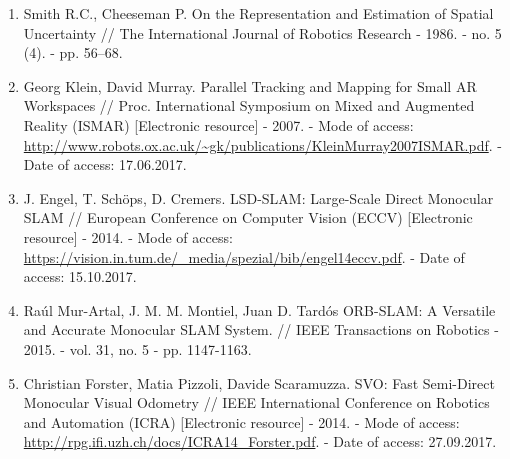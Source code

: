 \begin{enumerate}
    
    \item \label{itm:cheeseman} Smith R.C., Cheeseman P. On the Representation and Estimation of Spatial Uncertainty // The International Journal of Robotics Research - 1986. - no. 5 (4). - pp. 56–68.
    
    \item \label{itm:ptam} Georg Klein, David Murray. Parallel Tracking and Mapping for Small AR Workspaces // Proc. International Symposium on Mixed and Augmented Reality (ISMAR) [Electronic resource] - 2007. - Mode of access: \url{http://www.robots.ox.ac.uk/~gk/publications/KleinMurray2007ISMAR.pdf}. - Date of access: 17.06.2017.
    
    \item \label{itm:lsd} J. Engel, T. Schöps, D. Cremers. LSD-SLAM: Large-Scale Direct Monocular SLAM // European Conference on Computer Vision (ECCV) [Electronic resource] - 2014. - Mode of access: \url{https://vision.in.tum.de/_media/spezial/bib/engel14eccv.pdf}. - Date of access: 15.10.2017.
    
    \item \label{itm:orbslam} Raúl Mur-Artal, J. M. M. Montiel, Juan D. Tardós ORB-SLAM: A Versatile and Accurate Monocular SLAM System. // IEEE Transactions on Robotics - 2015. - vol. 31, no. 5 - pp. 1147-1163.
    
    \item \label{itm:last}\label{itm:svo} Christian Forster, Matia Pizzoli, Davide Scaramuzza. SVO: Fast Semi-Direct Monocular Visual Odometry // IEEE International Conference on Robotics and Automation (ICRA) [Electronic resource] - 2014. - Mode of access: \url{http://rpg.ifi.uzh.ch/docs/ICRA14_Forster.pdf}. - Date of access: 27.09.2017.
\end{enumerate}

\newpage
